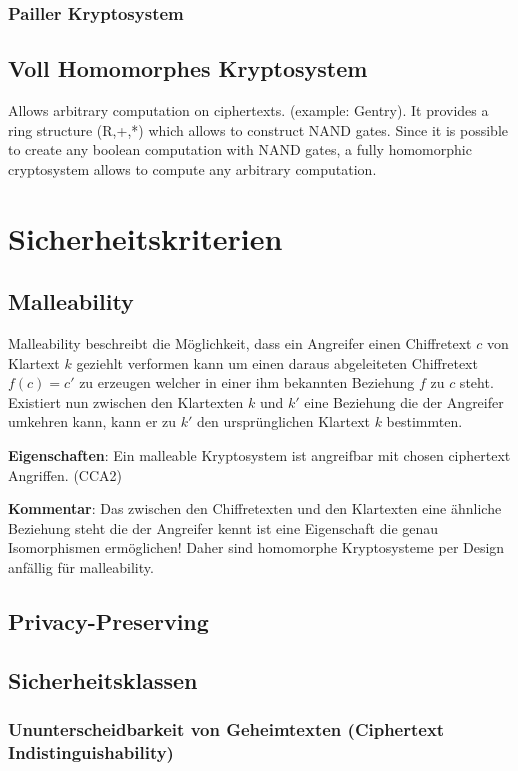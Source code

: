 \documentclass[12pt,a4paper]{scrartcl}	%
\begin{document}
\subsubsection{Pailler Kryptosystem}
\subsection{Voll Homomorphes Kryptosystem}
Allows arbitrary computation on ciphertexts. (example: Gentry). It provides a ring structure (R,+,*) which allows to construct NAND gates. Since it is possible to create any boolean computation with NAND gates, a fully homomorphic cryptosystem allows to compute any arbitrary computation.
\section{Sicherheitskriterien}
\label{Sicherheitskriterien}
\subsection{Malleability}
Malleability beschreibt die Möglichkeit, dass ein Angreifer einen Chiffretext $c$ von Klartext $k$ geziehlt verformen kann um einen daraus abgeleiteten Chiffretext $f(c)=c'$ zu erzeugen welcher in einer ihm bekannten Beziehung $f$ zu $c$ steht. Existiert nun zwischen den Klartexten $k$ und $k'$ eine Beziehung die der Angreifer umkehren kann, kann er zu $k'$ den ursprünglichen Klartext $k$ bestimmten. \cite[p. 292]{smart2003}

\textbf{Eigenschaften}: Ein malleable Kryptosystem ist angreifbar mit chosen ciphertext Angriffen. (CCA2)

\textbf{Kommentar}: Das zwischen den Chiffretexten und den Klartexten eine ähnliche Beziehung steht die der Angreifer kennt ist eine Eigenschaft die genau Isomorphismen ermöglichen! Daher sind homomorphe Kryptosysteme per Design anfällig für malleability.

\subsection{Privacy-Preserving}

\subsection{Sicherheitsklassen}
\subsubsection {Ununterscheidbarkeit von Geheimtexten (Ciphertext Indistinguishability)}
\end{document}
